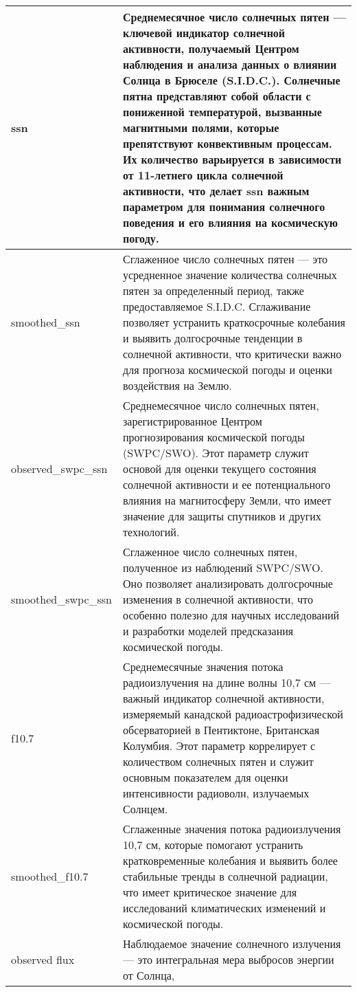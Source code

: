 \documentclass[14pt, a4paper]{src/bsu}
\begin{document}
\begin{longtable}{|l|p{12cm}|}
	ssn                      & Среднемесячное число солнечных пятен —
	ключевой индикатор солнечной активности, получаемый Центром
	наблюдения и анализа данных о влиянии Солнца в Брюселе (S.I.D.C.).
	Солнечные пятна представляют собой области с пониженной
	температурой, вызванные магнитными полями, которые препятствуют
	конвективным процессам. Их количество варьируется в зависимости от
	11-летнего цикла солнечной активности, что делает ssn важным
	параметром для понимания солнечного поведения и его влияния на
	космическую погоду.                                               \\ \hline smoothed\_ssn         & Сглаженное
	число солнечных пятен — это усредненное значение количества
	солнечных пятен за определенный период, также предоставляемое
	S.I.D.C. Сглаживание позволяет устранить краткосрочные колебания и
	выявить долгосрочные тенденции в солнечной активности, что
	критически важно для прогноза космической погоды и оценки
	воздействия на Землю.
	\\ \hline observed\_swpc\_ssn   & Среднемесячное число солнечных
	пятен, зарегистрированное Центром прогнозирования космической
	погоды (SWPC/SWO). Этот параметр служит основой для оценки текущего
	состояния солнечной активности и ее потенциального влияния на
	магнитосферу Земли, что имеет значение для защиты спутников и
	других технологий.
	\\ \hline smoothed\_swpc\_ssn   & Сглаженное число солнечных пятен,
	полученное из наблюдений SWPC/SWO. Оно позволяет анализировать
	долгосрочные изменения в солнечной активности, что особенно полезно
	для научных исследований и разработки моделей предсказания
	космической погоды.
	\\ \hline f10.7                 & Среднемесячные значения потока
	радиоизлучения на длине волны 10,7 см — важный индикатор солнечной
	активности, измеряемый канадской радиоастрофизической обсерваторией
	в Пентиктоне, Британская Колумбия. Этот параметр коррелирует с
	количеством солнечных пятен и служит основным показателем для
	оценки интенсивности радиоволн, излучаемых Солнцем.
	\\ \hline smoothed\_f10.7       & Сглаженные значения потока
	радиоизлучения 10,7 см, которые помогают устранить кратковременные
	колебания и выявить более стабильные тренды в солнечной радиации,
	что имеет критическое значение для исследований климатических
	изменений и космической погоды.
	\\ \hline observed flux         & Наблюдаемое значение солнечного
	излучения — это интегральная мера выбросов энергии от Солнца,

\end{longtable}
\end{document}
